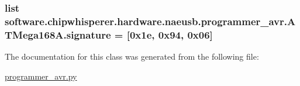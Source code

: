 \subsubsection[{signature}]{\setlength{\rightskip}{0pt plus 5cm}list software.\+chipwhisperer.\+hardware.\+naeusb.\+programmer\+\_\+avr.\+A\+T\+Mega168\+A.\+signature = \mbox{[}0x1e, 0x94, 0x06\mbox{]}\hspace{0.3cm}{\ttfamily [static]}}\label{classsoftware_1_1chipwhisperer_1_1hardware_1_1naeusb_1_1programmer__avr_1_1ATMega168A_a5beeac27a331578ef4fb6f6c54d17add}


The documentation for this class was generated from the following file\+:\begin{DoxyCompactItemize}
\item 
\hyperlink{programmer__avr_8py}{programmer\+\_\+avr.\+py}\end{DoxyCompactItemize}
